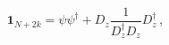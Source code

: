 \begin{equation}
\textbf{1}_{N+2k}=\psi\psi^{\dagger}
+D_z\frac{1}{ D^{\dagger}_zD_z}D^{\dagger}_z\,,\label{eq:2.11}
\end{equation}

